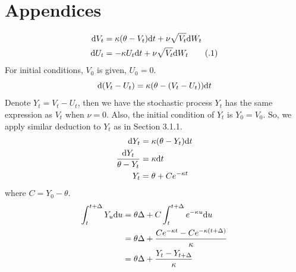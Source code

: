 \documentclass{ws-ijfe}
\newcommand\numberthis{\addtocounter{equation}{1}\tag{\theequation}}
\begin{document}

\appendix

\section{Appendices}

\begin{align*}
    \d V_t &= \kappa(\theta-V_t)\d t +\nu\sqrt{V_t}\d W_t\\
    \d U_t &= -\kappa U_t\d t + \nu\sqrt{V_t}\d W_t\numberthis\label{appeqnV_t}\\
\end{align*}
For initial conditions, $V_0$ is given, $U_0 = 0$.
\begin{equation*}
  \mathrm{d} (V_t-U_t) = \kappa(\theta-(V_t-U_t))\mathrm{d} t
\end{equation*}
Denote $Y_t=V_t-U_t$, then we have the stochastic process $Y_t$ has the same expression as $V_t$ when $\nu = 0$. Also, the initial condition of $Y_t$ is $Y_0 = V_0$. So, we apply similar deduction to $Y_t$ as in Section 3.1.1.
\begin{align*}
\mathrm{d} Y_t &=\kappa(\theta-Y_t)\mathrm{d} t\\
\frac{\mathrm{d} Y_t}{\theta-Y_t} &=\kappa \mathrm{d} t\\
Y_t &=\theta+Ce^{-\kappa t}\\
\end{align*}
where $C = Y_0-\theta$.
\begin{align*}
   \int^{t+\Delta}_t Y_u\mathrm{d} u & =\theta\Delta+C\int^{t+\Delta}_t e^{-\kappa u}\mathrm{d} u \\
    & =\theta\Delta+\frac{Ce^{-\kappa t}-Ce^{-\kappa (t+\Delta)}}{\kappa}\\
    &= \theta\Delta+\frac{Y_t-Y_{t+\Delta}}{\kappa}
  \end{align*}
\end{document}

